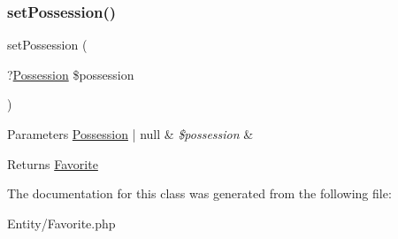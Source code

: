 \subsubsection{\texorpdfstring{setPossession()}{setPossession()}}
{\footnotesize\ttfamily set\+Possession (\begin{DoxyParamCaption}\item[{?\mbox{\hyperlink{class_app_1_1_entity_1_1_possession}{Possession}}}]{\$possession }\end{DoxyParamCaption})}


\begin{DoxyParams}[1]{Parameters}
\mbox{\hyperlink{class_app_1_1_entity_1_1_possession}{Possession}} | null & {\em \$possession} & \\
\hline
\end{DoxyParams}
\begin{DoxyReturn}{Returns}
\mbox{\hyperlink{class_app_1_1_entity_1_1_favorite}{Favorite}} 
\end{DoxyReturn}


The documentation for this class was generated from the following file\+:\begin{DoxyCompactItemize}
\item 
Entity/Favorite.\+php\end{DoxyCompactItemize}

